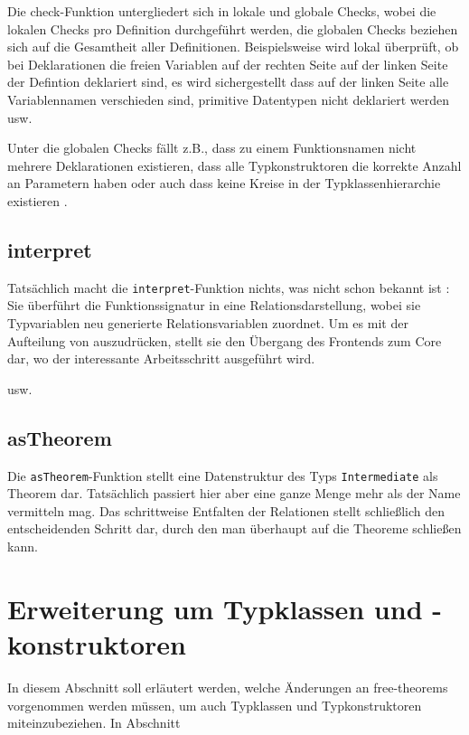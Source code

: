 \documentclass[11pt]{article} %
\begin{document}
Die check-Funktion untergliedert sich in lokale und globale Checks, wobei die lokalen Checks pro Definition durchgeführt werden, die globalen Checks beziehen sich auf die Gesamtheit aller Definitionen. Beispielsweise wird lokal überprüft, ob bei Deklarationen die freien Variablen auf der rechten Seite auf der linken Seite der Defintion deklariert sind, es wird sichergestellt
dass auf der linken Seite alle Variablennamen verschieden sind, primitive Datentypen nicht deklariert werden usw.

Unter die globalen Checks fällt z.B., dass zu einem Funktionsnamen nicht mehrere Deklarationen existieren, dass alle Typkonstruktoren die korrekte Anzahl an Parametern haben oder auch dass keine Kreise in der Typklassenhierarchie existieren \cite{freetheorems}.

\subsection{interpret}

Tatsächlich macht die \texttt{interpret}-Funktion nichts, was nicht schon bekannt ist : Sie überführt die Funktionssignatur in eine
Relationsdarstellung, wobei sie Typvariablen neu generierte Relationsvariablen zuordnet. Um es mit der Aufteilung von \cite{freetheorems} auszudrücken, stellt sie den Übergang des Frontends zum Core dar, wo der interessante Arbeitsschritt ausgeführt wird.

usw.

\subsection{asTheorem}

Die \texttt{asTheorem}-Funktion stellt eine Datenstruktur des Typs \texttt{Intermediate} als Theorem dar. Tatsächlich passiert hier aber eine ganze Menge mehr als der Name
vermitteln mag. Das schrittweise Entfalten  der Relationen stellt schließlich den entscheidenden Schritt dar, durch den man überhaupt auf
die Theoreme schließen kann.


\section{Erweiterung um Typklassen und -konstruktoren}

In diesem Abschnitt soll erläutert werden, welche Änderungen an free-theorems vorgenommen werden müssen, um auch Typklassen und Typkonstruktoren miteinzubeziehen. In
Abschnitt 
\end{document}
